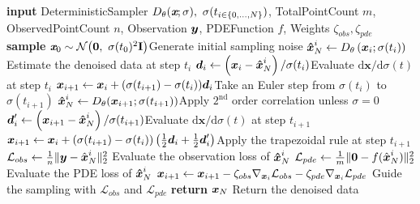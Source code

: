 \begin{algorithm}[!tbp]
	\caption{Sparse Observation and PDE Guided Diffusion Sampling Algorithm.}
	\label{alg1}
	\begin{algorithmic}[1]
		\State \textbf{input} DeterministicSampler $D_\theta(\textit{\textbf{x}};\sigma), ~\sigma(t_{i \in \{0, \dots, N\}})$, TotalPointCount $m$, ObservedPointCount $n$, Observation $\boldsymbol{y}$, PDEFunction $f$, Weights $\zeta_{obs}, \zeta_{pde}$
            \State \textbf{sample} $\textit{\textbf{x}}_0 \sim \mathcal{N} \big( \mathbf{0}, ~\sigma(t_0)^2\mathbf{I}\big)$\mycomment Generate initial sampling noise
                \State $\boldsymbol{\hat{x}}_N^i\leftarrow D_{\theta}\left(\boldsymbol{x}_{i} ; \sigma(t_{i})\right)$\mycomment Estimate the denoised data at step $t_{i}$
                \State $\boldsymbol{d}_{i} \leftarrow\left(\boldsymbol{x}_{i}-\boldsymbol{\hat{x}}_N^i\right) / \sigma(t_{i})$\mycomment Evaluate $\mathrm{d}\boldsymbol{x}/\mathrm{d}\sigma(t)$ at step $t_i$
                \State $\boldsymbol{x}_{i+1}\leftarrow \boldsymbol{x}_{i}+(\sigma(t_{i+1})-\sigma(t_i))\boldsymbol{d}_{i}$\mycomment Take an Euler step from $\sigma(t_i)$ to $\sigma(t_{i+1})$
                    \State $\boldsymbol{\hat{x}}_N^i\leftarrow D_\theta(\boldsymbol{x}_{i+1};\sigma(t_{i+1}))$\mycomment Apply $2^{\mathrm{nd}}$ order correlation unless $\sigma=0$
                    \State $\boldsymbol{d}_i^{\prime}\leftarrow\left(\boldsymbol{x}_{i+1}-\boldsymbol{\hat{x}}_N^i\right)/\sigma(t_{i+1})$\mycomment Evaluate $\mathrm{d}\boldsymbol{x}/\mathrm{d}\sigma(t)$ at step $t_{i+1}$
                    \State $\boldsymbol{x}_{i+1}\leftarrow\boldsymbol{x}_i+(\sigma(t_{i+1})-\sigma(t_i))\left(\frac12\boldsymbol{d}_i+\frac12\boldsymbol{d}_i^{\prime}\right)$\mycomment Apply the trapezoidal rule at step $t_{i+1}$
                \EndIf
                \State $\mathcal{L}_{obs} \leftarrow \frac1n\|\boldsymbol{y}-\hat{\boldsymbol{x}}_N^i\|_2^2$ \mycomment Evaluate the observation loss of $\boldsymbol{\hat{x}}_N^i$
                \State $\mathcal{L}_{pde} \leftarrow \frac1m\|\mathbf{0}-f(\hat{\boldsymbol{x}}_N^i)\|_2^2$ \mycomment Evaluate the PDE loss of $\boldsymbol{\hat{x}}_N^i$
                \State $\boldsymbol{x}_{i+1} \leftarrow \boldsymbol{x}_{i+1} - \zeta_{obs}\nabla_{\boldsymbol{x}_i}\mathcal{L}_{obs} - \zeta_{pde}\nabla_{\boldsymbol{x}_i}\mathcal{L}_{pde}$ \mycomment Guide the sampling with $\mathcal{L}_{obs}$ and $\mathcal{L}_{pde}$
            \EndFor
            \State \textbf{return} $\boldsymbol{x}_N$ \mycomment Return the denoised data
    \end{algorithmic}  
\end{algorithm}